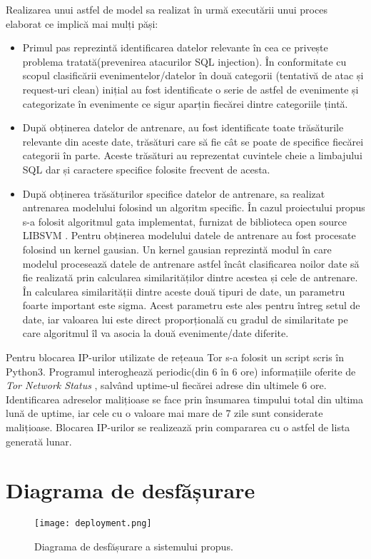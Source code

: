 Realizarea unui astfel de model sa realizat în urmă executării unui proces elaborat ce implică mai mulți păși: 
\begin{itemize}
	 \item  Primul pas reprezintă identificarea datelor relevante în cea ce privește problema tratată(prevenirea atacurilor SQL injection). În conformitate cu scopul clasificării evenimentelor/datelor în două categorii (tentativă de atac și request-uri clean) inițial au fost  identificate o serie de astfel de evenimente și categorizate în evenimente ce sigur aparțin fiecărei dintre categoriile țintă.  
	\item După  obținerea datelor de antrenare, au fost identificate toate trăsăturile relevante din aceste date, trăsături care să fie cât se poate de specifice fiecărei categorii în parte. Aceste trăsături au reprezentat cuvintele cheie a limbajului SQL dar și caractere specifice folosite frecvent de acesta. 
	\item După obținerea trăsăturilor specifice datelor de antrenare, sa realizat antrenarea modelului folosind un algoritm specific. În cazul proiectului propus s-a folosit algoritmul gata implementat, furnizat de biblioteca open source LIBSVM \cite{libsvm}. Pentru obținerea modelului datele de antrenare au fost procesate folosind un kernel gausian. Un kernel gausian reprezintă modul în care modelul procesează datele de antrenare astfel încât clasificarea noilor date să fie realizată prin calcularea similarităților dintre acestea și cele de antrenare. În calcularea similarității dintre aceste două tipuri de date, un parametru foarte important este sigma. Acest parametru este ales pentru întreg setul de date, iar valoarea lui este direct proporțională cu gradul de similaritate pe care algoritmul îl va asocia la două evenimente/date diferite. 
\end{itemize}

Pentru blocarea IP-urilor utilizate de rețeaua Tor s-a folosit un script scris în Python3. Programul interoghează periodic(din 6 în 6 ore) informațiile oferite de \textit{Tor Network Status} \cite{tot_status}, salvând uptime-ul fiecărei adrese din ultimele 6 ore. Identificarea adreselor malițioase se face prin însumarea timpului total din ultima lună de uptime, iar cele cu o valoare mai mare de 7 zile sunt considerate malițioase. Blocarea IP-urilor se realizează prin compararea cu o astfel de lista generată lunar. 

\section{Diagrama de desfășurare}
\begin{figure}[h]
	\centering
	\texttt{[image: deployment.png]}
	\caption{ Diagrama de desfășurare a sistemului propus. }
	\label{fig:deployment}
\end{figure}

